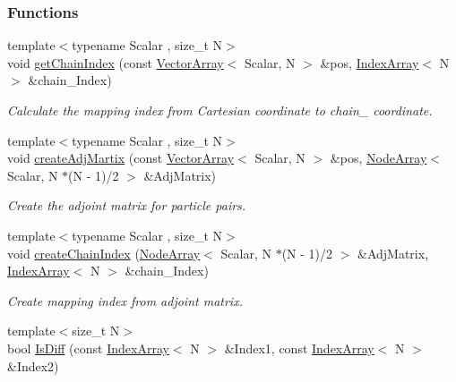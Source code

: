 \subsubsection*{Functions}
\begin{DoxyCompactItemize}
\item 
{\footnotesize template$<$typename Scalar , size\+\_\+t N$>$ }\\void \mbox{\hyperlink{namespacechain_a3e7b0a001442f121ce1408e7c9d12016}{get\+Chain\+Index}} (const \mbox{\hyperlink{namespacechain_aa715d2f046187ea9f0c3ea55605d6214}{Vector\+Array}}$<$ Scalar, N $>$ \&pos, \mbox{\hyperlink{namespacechain_aa40d2da395c0ac2bc5f37832442ac403}{Index\+Array}}$<$ N $>$ \&chain_\+Index)
\begin{DoxyCompactList}\small\item\em Calculate the mapping index from Cartesian coordinate to chain_ coordinate. \end{DoxyCompactList}\item
{\footnotesize template$<$typename Scalar , size\+\_\+t N$>$ }\\void \mbox{\hyperlink{namespacechain_a68d5d08ece7d82a6b4bb1968b783a8f3}{create\+Adj\+Martix}} (const \mbox{\hyperlink{namespacechain_aa715d2f046187ea9f0c3ea55605d6214}{Vector\+Array}}$<$ Scalar, N $>$ \&pos, \mbox{\hyperlink{namespacechain_a3a021b84403e03113e1dcd61ba304963}{Node\+Array}}$<$ Scalar, N $\ast$(N -\/ 1)/2 $>$ \&Adj\+Matrix)
\begin{DoxyCompactList}\small\item\em Create the adjoint matrix for particle pairs. \end{DoxyCompactList}\item 
{\footnotesize template$<$typename Scalar , size\+\_\+t N$>$ }\\void \mbox{\hyperlink{namespacechain_ae008a8273beabf1473c347994197ef53}{create\+Chain\+Index}} (\mbox{\hyperlink{namespacechain_a3a021b84403e03113e1dcd61ba304963}{Node\+Array}}$<$ Scalar, N $\ast$(N -\/ 1)/2 $>$ \&Adj\+Matrix, \mbox{\hyperlink{namespacechain_aa40d2da395c0ac2bc5f37832442ac403}{Index\+Array}}$<$ N $>$ \&chain_\+Index)
\begin{DoxyCompactList}\small\item\em Create mapping index from adjoint matrix. \end{DoxyCompactList}\item 
{\footnotesize template$<$size\+\_\+t N$>$ }\\bool \mbox{\hyperlink{namespacechain_a874f28a6248b56c6b2b3ca45c1bbea09}{Is\+Diff}} (const \mbox{\hyperlink{namespacechain_aa40d2da395c0ac2bc5f37832442ac403}{Index\+Array}}$<$ N $>$ \&Index1, const \mbox{\hyperlink{namespacechain_aa40d2da395c0ac2bc5f37832442ac403}{Index\+Array}}$<$ N $>$ \&Index2)

\end{DoxyCompactItemize}
